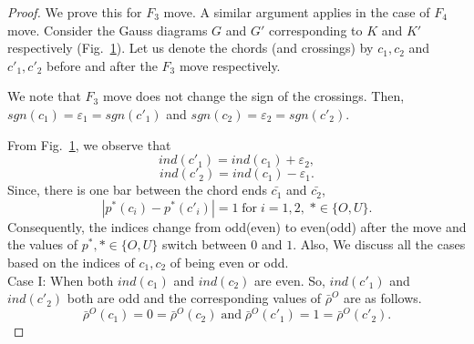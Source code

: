 \documentclass[10pt,a4paper]{amsart}
\begin{document}
	\begin{proof}
			We prove this for $F_3$ move. A similar argument applies in the case of $F_4$ move. Consider the Gauss
		diagrams $G$ and $G'$ corresponding to $K$ and $K'$ respectively (Fig.~\ref{fig:f3case}). Let us denote the  chords (and crossings) by $c_1, c_2$ and $c'_1, c'_2$ before and after the $F_3$ move  respectively.
			\begin{figure}[h!]
			\centering
			
			\caption{}
			\label{fig:f3case}
		\end{figure}
		
		We note that $F_3$ move does not change the sign of the crossings. Then, $sgn(c_1)=\varepsilon_{1}=sgn(c'_1)$ and $sgn(c_2)=\varepsilon_{2}=sgn(c'_2)$. 
		
		From Fig.~\ref{fig:f3case}, we observe that
		\[ind(c'_{1})=ind(c_{1}) + \varepsilon_{2},\]
		\[ind(c'_{2})=ind(c_{1}) - \varepsilon_{1}.\]
		Since, there is one bar between the chord ends  $\bar{c_1}$ and $\bar{c_2}$,
		\[|p^{*}(c_{i})-p^{*}(c'_{i})|=1 \; \text{for} \; i=1,2 , \; * \in \{O,U\}.\]
		Consequently, the indices change from odd(even) to even(odd) after the move and the values of $p^*, *\in \{O,U\}$ switch between $0$ and $1$. Also,  We discuss
		all the cases based on the indices of $c_1,c_2$ of being even or odd.\\
		\noindent
		Case I: When both $ind(c_{1})$ and $ind(c_{2})$ are even.
		So, $ind(c'_{1})$ and $ind(c'_{2})$ both are odd and the corresponding values of $\bar{\rho}^{O}$ are as follows.
		\[\bar{\rho}^{O}(c_{1})=0=\bar{\rho}^{O}(c_{2}) \; \text{and} \; \bar{\rho}^{O}(c'_{1})=1=\bar{\rho}^{O}(c'_{2}). \]
		

\end{proof}
\end{document}
